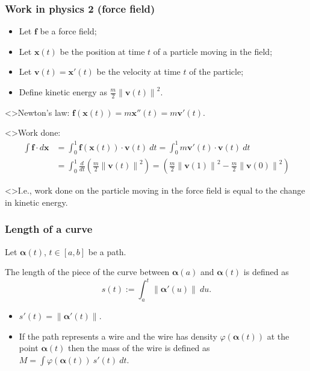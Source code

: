 \documentclass[aspectratio=169,handout]{beamer}
\newcommand{\norm}[1]{\left\|#1\right\|} %
\newcommand{\ff}{\mathbf{f}}
\newcommand{\vv}{\mathbf{v}}
\newcommand{\xx}{\mathbf{x}}
\newcommand{\aalpha}{\boldsymbol{\alpha}}
\begin{document}
\begin{frame}
    \frametitle{Work in physics 2 (force field)}

    \begin{itemize}
        \item Let \(\ff\) be a force field;
        \item Let \(\xx(t)\) be the position at time \(t\) of a particle moving in the field;
        \item Let \(\vv(t) = \xx'(t)\) be the velocity at time \(t\) of the particle;
        \item Define kinetic energy as \(\frac{m}{2} \norm{\vv(t)}^2\).
    \end{itemize}

    \structure<>{Newton's law:}
    \(\ff(\xx(t)) = m\xx''(t) = m \vv'(t)\).

    \structure<>{Work done:}
    \vspace{-1em}
    \[
        \begin{aligned}
            \int \ff \cdot d\xx
             & = \int_0^1 \ff(\xx(t)) \cdot \vv(t) \ dt
            = \int_0^1 m\vv'(t) \cdot \vv(t) \ dt                                   \\
             & = \int_0^1 \tfrac{d}{dt} \left( \tfrac{m}{2} \norm{\vv(t)}^2 \right)
            = \left(  \tfrac{m}{2} \norm{\vv(1)}^2  -  \tfrac{m}{2} \norm{\vv(0)}^2   \right)
        \end{aligned}
    \]

    \structure<>{I.e.,}
    work done on the particle moving in the force field is equal to the change in kinetic energy.

\end{frame}


\begin{frame}
    \frametitle{Length of a curve}

    Let \(\aalpha(t)\), \(t\in [a,b]\) be a path.
    \begin{definition}
        The length of the piece of the curve between \(\aalpha(a)\) and \(\aalpha(t)\) is defined as
        \[
            s(t) := \int_a^t \norm{\aalpha'(u)} \ du.
        \]
    \end{definition}

    \begin{itemize}
        \item  \(s'(t) = \norm{\aalpha'(t)} \).
        \item If the path represents a wire and the wire has density \(\varphi(\aalpha(t))\) at the point \(\aalpha(t)\) then the mass of the wire is defined as
              \(M = \displaystyle\int \varphi(\aalpha(t)) \ s'(t) \ dt\).
    \end{itemize}



\end{frame}
\end{document}

